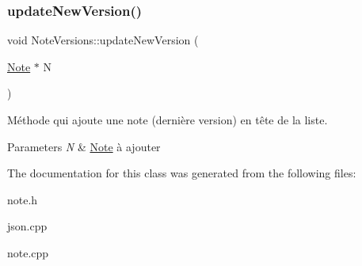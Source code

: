 \subsubsection{\texorpdfstring{update\+New\+Version()}{updateNewVersion()}}
{\footnotesize\ttfamily void Note\+Versions\+::update\+New\+Version (\begin{DoxyParamCaption}\item[{\hyperlink{classNote}{Note} $\ast$}]{N }\end{DoxyParamCaption})}



Méthode qui ajoute une note (dernière version) en tête de la liste. 


\begin{DoxyParams}{Parameters}
{\em N} & \hyperlink{classNote}{Note} à ajouter \\
\hline
\end{DoxyParams}


The documentation for this class was generated from the following files\+:\begin{DoxyCompactItemize}
\item 
note.\+h\item 
json.\+cpp\item 
note.\+cpp\end{DoxyCompactItemize}
